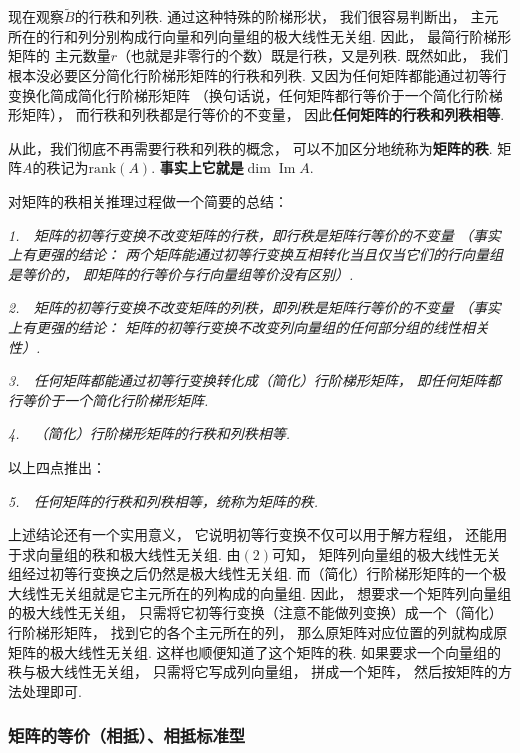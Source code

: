 现在观察$\tilde{B}$的行秩和列秩.
通过这种特殊的阶梯形状，
我们很容易判断出，
主元所在的行和列分别构成行向量和列向量组的极大线性无关组.
因此，
最简行阶梯形矩阵的
主元数量$r$（也就是非零行的个数）既是行秩，又是列秩.
既然如此，
我们根本没必要区分简化行阶梯形矩阵的行秩和列秩.
又因为任何矩阵都能通过初等行变换化简成简化行阶梯形矩阵
（换句话说，任何矩阵都行等价于一个简化行阶梯形矩阵），
而行秩和列秩都是行等价的不变量，
因此\textbf{任何矩阵的行秩和列秩相等}.

从此，我们彻底不再需要行秩和列秩的概念，
可以不加区分地统称为\textbf{矩阵的秩}.
矩阵$A$的秩记为$\text{rank}(A)$.
\textbf{事实上它就是$\dim\operatorname{Im}A$}.

\medskip

对矩阵的秩相关推理过程做一个简要的总结：\medskip

\textit{1.~~矩阵的初等行变换不改变矩阵的行秩，即行秩是矩阵行等价的不变量
（事实上有更强的结论：
两个矩阵能通过初等行变换互相转化当且仅当它们的行向量组是等价的，
即矩阵的行等价与行向量组等价没有区别）.}

\textit{2.~~矩阵的初等行变换不改变矩阵的列秩，即列秩是矩阵行等价的不变量
（事实上有更强的结论：
矩阵的初等行变换不改变列向量组的任何部分组的线性相关性）.}

\textit{3.~~任何矩阵都能通过初等行变换转化成（简化）行阶梯形矩阵，
即任何矩阵都行等价于一个简化行阶梯形矩阵.}

\textit{4.~~（简化）行阶梯形矩阵的行秩和列秩相等.}\medskip

以上四点推出：\medskip

\textit{5.~~任何矩阵的行秩和列秩相等，统称为矩阵的秩.}

\medskip

上述结论还有一个实用意义，
它说明初等行变换不仅可以用于解方程组，
还能用于求向量组的秩和极大线性无关组.
由$(2)$可知，
矩阵列向量组的极大线性无关组经过初等行变换之后仍然是极大线性无关组.
而（简化）行阶梯形矩阵的一个极大线性无关组就是它主元所在的列构成的向量组.
因此，
想要求一个矩阵列向量组的极大线性无关组，
只需将它初等行变换（注意不能做列变换）成一个（简化）行阶梯形矩阵，
找到它的各个主元所在的列，
那么原矩阵对应位置的列就构成原矩阵的极大线性无关组.
这样也顺便知道了这个矩阵的秩.
如果要求一个向量组的秩与极大线性无关组，
只需将它写成列向量组，
拼成一个矩阵，
然后按矩阵的方法处理即可.






\subsubsection{矩阵的等价（相抵）、相抵标准型}


